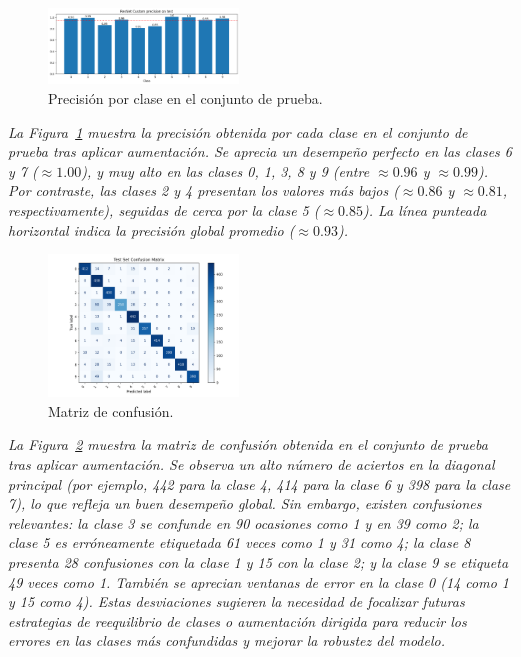 \documentclass[conference]{IEEEtran}
\begin{document}
\begin{figure}[H]
    \centering
    \includegraphics[width=0.45\textwidth]{graphics-resnet-raw/resnet_raw_with_class_precision.png}
    \caption{Precisión por clase en el conjunto de prueba.}
    \label{fig:resnet_raw_with_class_precision}
\end{figure}
\noindent\textit{%
La Figura~\ref{fig:resnet_raw_with_class_precision} muestra la precisión obtenida por cada clase en el conjunto de prueba tras aplicar aumentación. Se aprecia un desempeño perfecto en las clases 6 y 7 (\(\approx1.00\)), y muy alto en las clases 0, 1, 3, 8 y 9 (entre \(\approx0.96\) y \(\approx0.99\)). Por contraste, las clases 2 y 4 presentan los valores más bajos (\(\approx0.86\) y \(\approx0.81\), respectivamente), seguidas de cerca por la clase 5 (\(\approx0.85\)). La línea punteada horizontal indica la precisión global promedio (\(\approx0.93\)). 
}

\begin{figure}[H]
    \centering
    \includegraphics[width=0.45\textwidth]{graphics-resnet-raw/resnet_raw_with_confusion_matrix.png}
    \caption{Matriz de confusión.}
    \label{fig:resnet_raw_with_confusion_matrix}
\end{figure}
\noindent\textit{%
La Figura~\ref{fig:resnet_raw_with_confusion_matrix} muestra la matriz de confusión obtenida en el conjunto de prueba tras aplicar aumentación. Se observa un alto número de aciertos en la diagonal principal (por ejemplo, 442 para la clase 4, 414 para la clase 6 y 398 para la clase 7), lo que refleja un buen desempeño global. Sin embargo, existen confusiones relevantes: la clase 3 se confunde en 90 ocasiones como 1 y en 39 como 2; la clase 5 es erróneamente etiquetada 61 veces como 1 y 31 como 4; la clase 8 presenta 28 confusiones con la clase 1 y 15 con la clase 2; y la clase 9 se etiqueta 49 veces como 1. También se aprecian ventanas de error en la clase 0 (14 como 1 y 15 como 4). Estas desviaciones sugieren la necesidad de focalizar futuras estrategias de reequilibrio de clases o aumentación dirigida para reducir los errores en las clases más confundidas y mejorar la robustez del modelo.%
}
\end{document}

